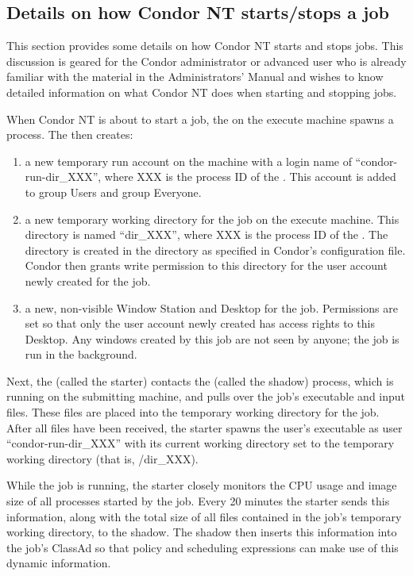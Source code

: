 \subsection{Details on how Condor NT starts/stops a job}

This section provides some details on how Condor NT starts and stops jobs.
This discussion is geared for the Condor administrator or advanced user who is
already familiar with the material in the Administrators' Manual
and wishes to know detailed information on what Condor NT does when
starting and stopping jobs.

When Condor NT is about to start a job, the  on the execute
machine spawns a  process.  The  then
creates:
\begin{enumerate}

\item a new temporary run account on the machine with a login name of
``condor-run-dir\_XXX'', where XXX is the process ID of the
.  This account is added to group Users and group Everyone.

\item a new temporary working directory for the job on the execute machine.
This directory is
named ``dir\_XXX'', where XXX is the process ID of the .
The directory is created in the  directory as
specified in Condor's configuration file.  Condor then grants write
permission to this directory for the user account newly created for the
job.

\item a new, non-visible Window Station and Desktop for the job.
Permissions are set so that only the
user account newly created has access rights to this Desktop.  Any windows
created by this job are not seen by anyone; the job is run in the
background.

\end{enumerate}

Next, the  (called the starter) contacts the 
(called the shadow) process, which is
running on the submitting machine, and pulls over the job's executable and
input files.
These files are placed into the temporary working directory for the job.
After all files have been received,
the starter spawns the user's executable as user ``condor-run-dir\_XXX''
with its current working directory set to the temporary working directory
(that is, /dir\_XXX).

While the job is running, the starter closely monitors the CPU
usage and image size of all processes started by the job.
Every 20 minutes the starter sends this information,
along with the total size of all files contained in the job's
temporary working directory, to the shadow.
The shadow then
inserts this information into the job's ClassAd so that policy and
scheduling expressions can make use of this dynamic information.

